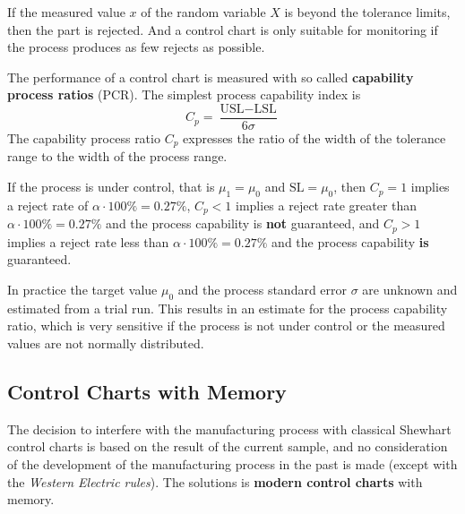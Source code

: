 \documentclass[11pt]{article}
\theoremstyle{definition}
\begin{document}
If the measured value $x$ of the random variable $X$ is beyond the tolerance limits, then the part is rejected. And a control chart is only suitable for monitoring if the process produces as few rejects as possible.

The performance of a control chart is measured with so called \textbf{capability process ratios} (PCR). The simplest process capability index is
\begin{equation*}
	C_p = \frac{\text{USL} - \text{LSL}}{6\sigma}
\end{equation*}
The capability process ratio $C_p$ expresses the ratio of the width of the tolerance range to the width of the process range.

\vspace{1em}
\noindent
If the process is under control, that is $\mu_1 = \mu_0$ and $\text{SL} = \mu_0$, then $C_p = 1$ implies a reject rate of $\alpha\cdot100\% = 0.27\%$, $C_p < 1$ implies a reject rate greater than $\alpha\cdot100\% = 0.27\%$ and the process capability is \textbf{not} guaranteed, and $C_p > 1$ implies a reject rate less than $\alpha\cdot100\% = 0.27\%$ and the process capability \textbf{is} guaranteed.

In practice the target value $\mu_0$ and the process standard error $\sigma$ are unknown and estimated from a trial run. This results in an estimate for the process capability ratio, which is very sensitive if the process is not under control or the measured values are not normally distributed.

\subsection{Control Charts with Memory}
The decision to interfere with the manufacturing process with classical Shewhart control charts is based on the result of the current sample, and no consideration of the development of the manufacturing process in the past is made (except with the \textit{Western Electric rules}). The solutions is \textbf{modern control charts} with memory.
\end{document}
